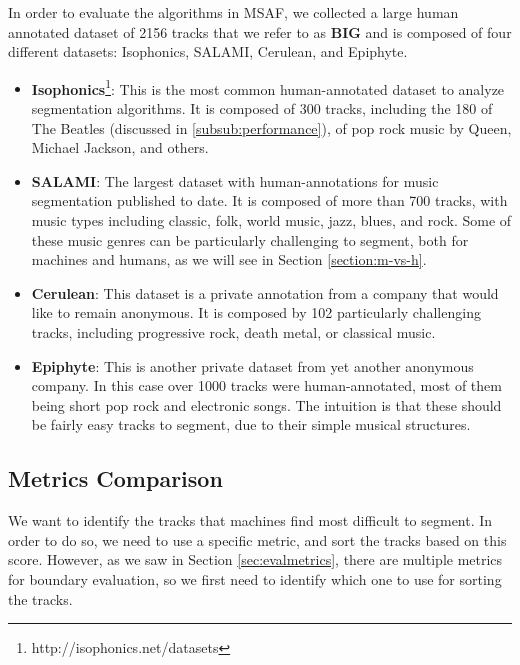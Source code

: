 \documentclass{article}
\begin{document}
In order to evaluate the algorithms in MSAF, we collected a large human annotated dataset of 2156 tracks that we refer to as \textbf{BIG} and is composed of four different datasets: Isophonics, SALAMI, Cerulean, and Epiphyte.

\begin{itemize}
  \item
    \textbf{Isophonics}\footnote{http://isophonics.net/datasets}: This is the most common human-annotated dataset to analyze segmentation algorithms. 
    It is composed of 300 tracks, including the 180 of The Beatles (discussed in \ref{subsub:performance}), of pop rock music by Queen, Michael Jackson, and others.

  \item
    \textbf{SALAMI}\cite{Smith2011}: The largest dataset with human-annotations for music segmentation published to date. 
    It is composed of more than 700 tracks, with music types including classic, folk, world music, jazz, blues, and rock.
    Some of these music genres can be particularly challenging to segment, both for machines and humans, as we will see in Section \ref{section:m-vs-h}.

  \item
    \textbf{Cerulean}: This dataset is a private annotation from a company that would like to remain anonymous.
    It is composed by 102 particularly challenging tracks, including progressive rock, death metal, or classical music.

  \item
    \textbf{Epiphyte}: This is another private dataset from yet another anonymous company.
    In this case over 1000 tracks were human-annotated, most of them being short pop rock and electronic songs.
    The intuition is that these should be fairly easy tracks to segment, due to their simple musical structures.

\end{itemize}

\subsection{Metrics Comparison}

We want to identify the tracks that machines find most difficult to segment.
In order to do so, we need to use a specific metric, and sort the tracks based on this score.
However, as we saw in Section \ref{sec:evalmetrics}, there are multiple metrics for boundary evaluation, so we first need to identify which one to use for sorting the tracks.
\end{document}
